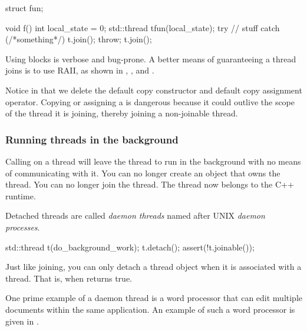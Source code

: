 \begin{CPP}[label=list:try-catch-join,caption=Try-catch for exceptional joins]
struct fun;
  
void f() {
    int local_state = 0;
    std::thread t{fun(local_state)};
    try {
        // stuff
    }
    catch (/*something*/) {
        t.join();
        throw;
    }
    t.join();
}
\end{CPP}

Using  blocks is verbose and bug-prone. A better means of guaranteeing a thread joins is to use RAII, as shown in , , and .


Notice in  that we delete the default copy constructor and default copy assignment operator. Copying or assigning a  is dangerous because it could outlive the scope of the thread it is joining, thereby joining a non-joinable thread.

\subsubsection{Running threads in the background}
Calling  on a thread will leave the thread to run in the background with no means of communicating with it. You can no longer create an  object that owns the thread. You can no longer join the thread. The thread now belongs to the C++ runtime.

Detached threads are called \emph{daemon threads} named after UNIX \emph{daemon processes}.

\begin{CPP}
std::thread t(do_background_work);
t.detach();
assert(!t.joinable());
\end{CPP}

Just like joining, you can only detach a thread object when it is associated with a thread. That is, when  returns true.

One prime example of a daemon thread is a word processor that can edit multiple documents within the same application. An example of such a word processor is given in .

